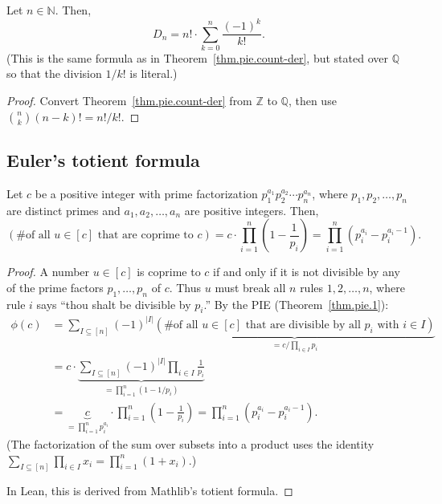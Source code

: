 \begin{theorem}
\label{thm.pie.count-der.rat}
\leanhelper
\leanok
Let $n \in \mathbb{N}$. Then,
\[
D_n = n! \cdot \sum_{k=0}^{n} \frac{(-1)^k}{k!}.
\]
(This is the same formula as in Theorem~\ref{thm.pie.count-der}, but stated
over $\mathbb{Q}$ so that the division $1/k!$ is literal.)
\end{theorem}

\begin{proof}
Convert Theorem~\ref{thm.pie.count-der} from $\mathbb{Z}$ to $\mathbb{Q}$, then
use $\binom{n}{k} (n-k)! = n!/k!$.
\end{proof}

\subsection{Euler's totient formula}

\begin{theorem}
\label{thm.pie.euler-tot}
\leantarget
\leanok
Let $c$ be a positive integer with prime factorization
$p_1^{a_1} p_2^{a_2} \cdots p_n^{a_n}$, where $p_1, p_2, \ldots, p_n$ are
distinct primes and $a_1, a_2, \ldots, a_n$ are positive integers. Then,
\[
\left(\text{\# of all } u \in [c] \text{ that are coprime to } c\right)
= c \cdot \prod_{i=1}^{n} \left(1 - \frac{1}{p_i}\right)
= \prod_{i=1}^{n} \left(p_i^{a_i} - p_i^{a_i - 1}\right).
\]
\end{theorem}

\begin{proof}
A number $u \in [c]$ is coprime to $c$ if and only if it is not divisible by any of
the prime factors $p_1, \ldots, p_n$ of $c$. Thus $u$ must break all $n$ rules
$1, 2, \ldots, n$, where rule $i$ says ``thou shalt be divisible by $p_i$.''
By the PIE (Theorem~\ref{thm.pie.1}):
\begin{align*}
\phi(c) &= \sum_{I \subseteq [n]} (-1)^{|I|}
\underbrace{\left(\text{\# of all } u \in [c] \text{ that are divisible by all }
p_i \text{ with } i \in I\right)}_{= c / \prod_{i \in I} p_i} \\
&= c \cdot \underbrace{\sum_{I \subseteq [n]} (-1)^{|I|}
\prod_{i \in I} \frac{1}{p_i}}_{= \prod_{i=1}^{n} (1 - 1/p_i)} \\
&= \underbrace{c}_{= \prod_{i=1}^{n} p_i^{a_i}} \cdot \prod_{i=1}^{n}
\left(1 - \frac{1}{p_i}\right)
= \prod_{i=1}^{n} \left(p_i^{a_i} - p_i^{a_i - 1}\right).
\end{align*}
(The factorization of the sum over subsets into a product uses the identity
$\sum_{I \subseteq [n]} \prod_{i \in I} x_i = \prod_{i=1}^{n}(1 + x_i)$.)

In Lean, this is derived from Mathlib's totient formula.
\end{proof}

